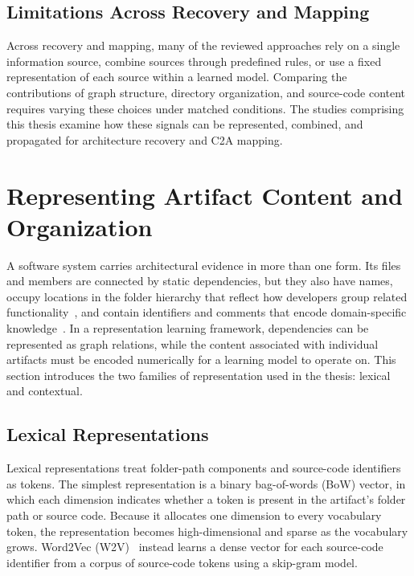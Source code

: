 \subsection{Limitations Across Recovery and Mapping}

Across recovery and mapping, many of the reviewed approaches rely on a single information source, combine sources through predefined rules, or use a fixed representation of each source within a learned model. Comparing the contributions of graph structure, directory organization, and source-code content requires varying these choices under matched conditions. The studies comprising this thesis examine how these signals can be represented, combined, and propagated for architecture recovery and C2A mapping.

\section[Representing Artifact Content]{Representing Artifact Content and Organization \label{sec:bg_content}}

A software system carries architectural evidence in more than one form. Its files and members are connected by static dependencies, but they also have names, occupy locations in the folder hierarchy that reflect how developers group related functionality~\cite{garcia2013}, and contain identifiers and comments that encode domain-specific knowledge~\cite{sarif}. In a representation learning framework, dependencies can be represented as graph relations, while the content associated with individual artifacts must be encoded numerically for a learning model to operate on. This section introduces the two families of representation used in the thesis: lexical and contextual.

\subsection{Lexical Representations \label{sec:bg_lexical}}

Lexical representations treat folder-path components and source-code identifiers as tokens. The simplest representation is a binary bag-of-words (BoW) vector, in which each dimension indicates whether a token is present in the artifact’s folder path or source code. Because it allocates one dimension to every vocabulary token, the representation becomes high-dimensional and sparse as the vocabulary grows. Word2Vec (W2V)~\cite{word2vec} instead learns a dense vector for each source-code identifier from a corpus of source-code tokens using a skip-gram model.

